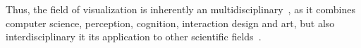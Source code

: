 Thus, the field of visualization is inherently an multidisciplinary~\cite{defanti1989visualization}, as it combines computer science, perception, cognition, interaction design and art, but also interdisciplinary it its application to other scientific fields~\cite{kirby2013visualization}.


